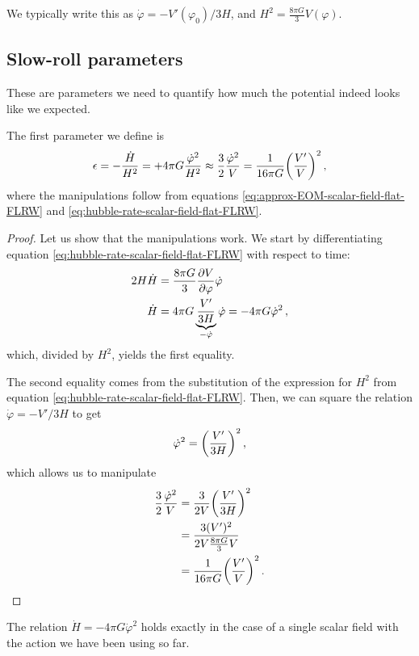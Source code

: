 \documentclass[main.tex]{subfiles}
\begin{document}
We typically write this as \(\dot{\varphi} = - V' (\varphi_0 ) / 3H\), and \(H^2 = \frac{8 \pi G}{3} V(\varphi )\). 

\subsection{Slow-roll parameters}

These are parameters we need to quantify how much the potential indeed looks like we expected. 

The first parameter we define is
%
\begin{align} \label{eq:slow-roll-epsilon-alternative}
\epsilon 
= - \frac{\dot{H}}{H^2} = 
+ 4 \pi G \frac{\dot{\varphi}^2}{H^2} \approx \frac{3}{2} \frac{\dot{\varphi}^2}{V} = \frac{1}{16 \pi G} \qty(\frac{V'}{V})^2
\,,
\end{align}
%
where the manipulations follow from equations \eqref{eq:approx-EOM-scalar-field-flat-FLRW} and \eqref{eq:hubble-rate-scalar-field-flat-FLRW}.

\begin{proof}
Let us show that the manipulations work. We start by differentiating equation \eqref{eq:hubble-rate-scalar-field-flat-FLRW} with respect to time: 
%
\begin{align}
2 H \dot{H} &= \frac{8 \pi G}{3} \pdv{V}{\varphi } \dot{\varphi}  \\
\dot{H} &= 4 \pi G \underbrace{\frac{V'}{3 H}}_{- \dot{\varphi}} \dot{\varphi} = - 4 \pi G \dot{\varphi}^2 \label{eq:hdot-phidot-relation}
\,,
\end{align}
%
which, divided by \(H^2\), yields the first equality. 

The second equality comes from the substitution of the expression for \(H^2\) from equation \eqref{eq:hubble-rate-scalar-field-flat-FLRW}. 
Then, we can square the relation \(\dot{\varphi} = - V' / 3 H\) to get 
%
\begin{align}
\dot{\varphi}^2 = \qty(\frac{V'}{3H})^2
\,,
\end{align}
%
which allows us to manipulate 
%
\begin{align}
\frac{3}{2} \frac{\dot{\varphi}^2}{V} &= \frac{3}{2V} \qty(\frac{V'}{3H})^2  \\
&= \frac{3 (V')^2}{2V \frac{8 \pi G}{3} V}  \\
&= \frac{1}{16 \pi G} \qty( \frac{V'}{V})^2
\,.
\end{align}
\end{proof}

\begin{claim}
The relation \(\dot{H} = - 4 \pi G \dot{\varphi}^2\) holds exactly in the case of a single scalar field with the action we have been using so far. 
\end{claim}
\end{document}
